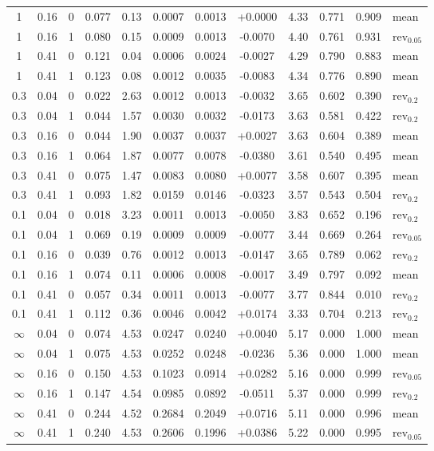 \documentclass[aps,pra,onecolumn,notitlepage,superscriptaddress,nofootinbib,floatfix]{revtex4-2}
\begin{document}
\begin{table}[t]
\begin{ruledtabular}
\begin{tabular}{ccccccccccc l}
1 & 0.16 & 0 & 0.077 & 0.13 & 0.0007 & 0.0013 & +0.0000 & 4.33 & 0.771 & 0.909 & mean\\
1 & 0.16 & 1 & 0.080 & 0.15 & 0.0009 & 0.0013 & -0.0070 & 4.40 & 0.761 & 0.931 & rev$_{0.05}$\\
1 & 0.41 & 0 & 0.121 & 0.04 & 0.0006 & 0.0024 & -0.0027 & 4.29 & 0.790 & 0.883 & mean\\
1 & 0.41 & 1 & 0.123 & 0.08 & 0.0012 & 0.0035 & -0.0083 & 4.34 & 0.776 & 0.890 & mean\\
0.3 & 0.04 & 0 & 0.022 & 2.63 & 0.0012 & 0.0013 & -0.0032 & 3.65 & 0.602 & 0.390 & rev$_{0.2}$\\
0.3 & 0.04 & 1 & 0.044 & 1.57 & 0.0030 & 0.0032 & -0.0173 & 3.63 & 0.581 & 0.422 & rev$_{0.2}$\\
0.3 & 0.16 & 0 & 0.044 & 1.90 & 0.0037 & 0.0037 & +0.0027 & 3.63 & 0.604 & 0.389 & mean\\
0.3 & 0.16 & 1 & 0.064 & 1.87 & 0.0077 & 0.0078 & -0.0380 & 3.61 & 0.540 & 0.495 & mean\\
0.3 & 0.41 & 0 & 0.075 & 1.47 & 0.0083 & 0.0080 & +0.0077 & 3.58 & 0.607 & 0.395 & mean\\
0.3 & 0.41 & 1 & 0.093 & 1.82 & 0.0159 & 0.0146 & -0.0323 & 3.57 & 0.543 & 0.504 & rev$_{0.2}$\\
0.1 & 0.04 & 0 & 0.018 & 3.23 & 0.0011 & 0.0013 & -0.0050 & 3.83 & 0.652 & 0.196 & rev$_{0.2}$\\
0.1 & 0.04 & 1 & 0.069 & 0.19 & 0.0009 & 0.0009 & -0.0077 & 3.44 & 0.669 & 0.264 & rev$_{0.05}$\\
0.1 & 0.16 & 0 & 0.039 & 0.76 & 0.0012 & 0.0013 & -0.0147 & 3.65 & 0.789 & 0.062 & rev$_{0.2}$\\
0.1 & 0.16 & 1 & 0.074 & 0.11 & 0.0006 & 0.0008 & -0.0017 & 3.49 & 0.797 & 0.092 & mean\\
0.1 & 0.41 & 0 & 0.057 & 0.34 & 0.0011 & 0.0013 & -0.0077 & 3.77 & 0.844 & 0.010 & rev$_{0.2}$\\
0.1 & 0.41 & 1 & 0.112 & 0.36 & 0.0046 & 0.0042 & +0.0174 & 3.33 & 0.704 & 0.213 & rev$_{0.2}$\\
$\infty$ & 0.04 & 0 & 0.074 & 4.53 & 0.0247 & 0.0240 & +0.0040 & 5.17 & 0.000 & 1.000 & mean\\
$\infty$ & 0.04 & 1 & 0.075 & 4.53 & 0.0252 & 0.0248 & -0.0236 & 5.36 & 0.000 & 1.000 & mean\\
$\infty$ & 0.16 & 0 & 0.150 & 4.53 & 0.1023 & 0.0914 & +0.0282 & 5.16 & 0.000 & 0.999 & rev$_{0.05}$\\
$\infty$ & 0.16 & 1 & 0.147 & 4.54 & 0.0985 & 0.0892 & -0.0511 & 5.37 & 0.000 & 0.999 & rev$_{0.2}$\\
$\infty$ & 0.41 & 0 & 0.244 & 4.52 & 0.2684 & 0.2049 & +0.0716 & 5.11 & 0.000 & 0.996 & mean\\
$\infty$ & 0.41 & 1 & 0.240 & 4.53 & 0.2606 & 0.1996 & +0.0386 & 5.22 & 0.000 & 0.995 & rev$_{0.05}$\\
\end{tabular}
\end{ruledtabular}
\end{table}
\end{document}
